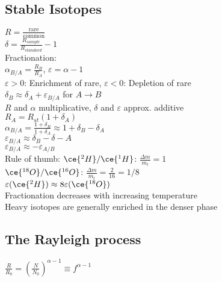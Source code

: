 \subsection*{Stable Isotopes}
$R=\frac{\text{rare}}{\text{common}}$\\
$\delta = \frac{R_{sample}}{R_{standard}}-1$\\
Fractionation:\\
$\alpha_{B/A}=\frac{R_B}{R_A}$, $\varepsilon=\alpha -1$\\
$\varepsilon>0$: Enrichment of rare, $\varepsilon<0$: Depletion of rare\\
$\delta_B\approx\delta_A+\varepsilon_{B/A}$ for $A\rightarrow B$\\
$R$ and $\alpha$ multiplicative, $\delta$ and $\varepsilon$ approx. additive\\
$R_A=R_{st}(1+\delta_A)$\\
$\alpha_{B/A}=\frac{1+\delta_B}{1+\delta_A}\approx 1+\delta_B-\delta_A$\\
$\varepsilon_{B/A}\approx \delta_B-\delta-A$\\
$\varepsilon_{B/A}\approx -\varepsilon_{A/B}$\\
Rule of thumb: $\ce{^2H}/\ce{^1H}$: $\frac{\Delta m}{m_l}=1$\\
$\ce{^{18}O}/\ce{^{16}O}$: $\frac{\Delta m}{m_l}=\frac{2}{16}=1/8$\\
$\varepsilon(\ce{^2H})\approx 8\varepsilon(\ce{^{18}O})$\\
Fractionation decreases with increasing temperature\\
Heavy isotopes are generally enriched in the denser phase
\subsection*{The Rayleigh process}
$\frac{R}{R_0}=\left(\frac{N}{N_0}\right)^{\alpha-1}\equiv f^{\alpha-1}$